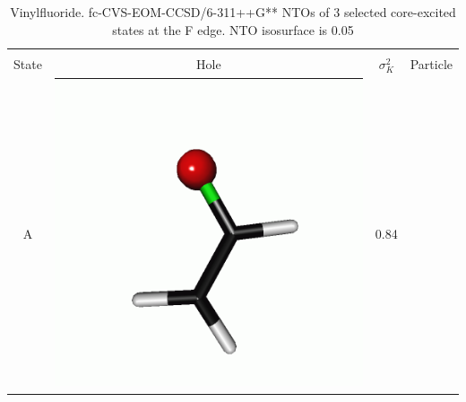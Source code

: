 \documentclass[journal=jctcce,manuscript=article]{achemso}
\begin{document}
\begin{table}[H]
 \centering
 \caption{Vinylfluoride. fc-CVS-EOM-CCSD/6-311++G** 
 NTOs of 3 selected core-excited states at the F edge. 
 NTO isosurface is 0.05\label{vinylfluoride-ntos-Fedge}
 \label{NTOs:fluorine}}
 \vspace{3em}
 \begin{tabular}{ c | c c c }
     \hline
             & \multicolumn{3}{c}{} \\
     State &  Hole & $\sigma_K^2$ & Particle \\
     \hline
     A &  
     \begin{minipage}{0.2\textwidth}
         \centering
         \includegraphics[scale=0.10]{NTO/CH2CHF/CH2CHF_F_1h.png}
     \end{minipage}
     & 0.84
     &  \begin{minipage}{0.2\textwidth}
         \centering

\end{minipage}
\end{tabular}
\end{table}
\end{document}
